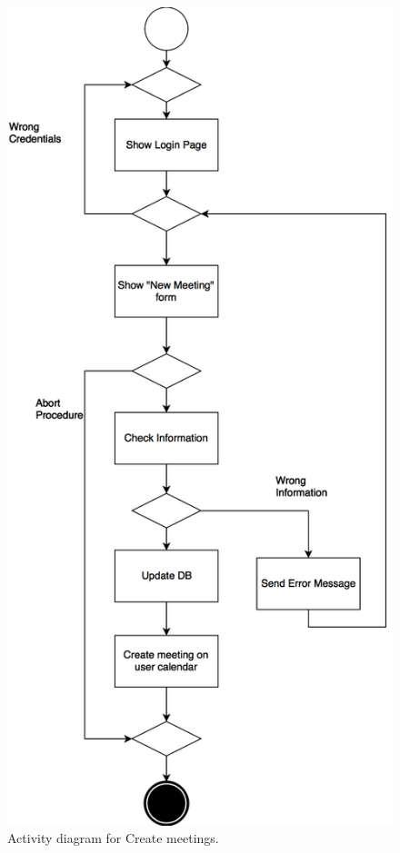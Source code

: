 \documentclass{article}
\begin{document}
	\begin{figure}[h!]
		\bigskip
		\centering
		\includegraphics[scale=0.25]{img/diagrams/create_meetings_ad.png}
		\caption{Activity diagram for Create meetings.}
	\end{figure}
	
\end{document}
